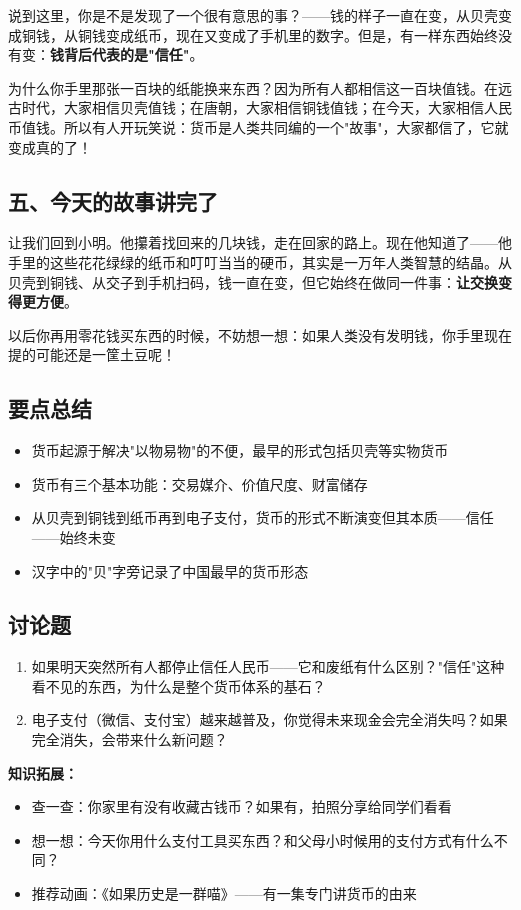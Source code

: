 \documentclass[a4paper,12pt]{ctexart}
\begin{document}
说到这里，你是不是发现了一个很有意思的事？——钱的样子一直在变，从贝壳变成铜钱，从铜钱变成纸币，现在又变成了手机里的数字。但是，有一样东西始终没有变：\textbf{钱背后代表的是"信任"}。

为什么你手里那张一百块的纸能换来东西？因为所有人都相信这一百块值钱。在远古时代，大家相信贝壳值钱；在唐朝，大家相信铜钱值钱；在今天，大家相信人民币值钱。所以有人开玩笑说：货币是人类共同编的一个"故事"，大家都信了，它就变成真的了！

\subsection*{五、今天的故事讲完了}

让我们回到小明。他攥着找回来的几块钱，走在回家的路上。现在他知道了——他手里的这些花花绿绿的纸币和叮叮当当的硬币，其实是一万年人类智慧的结晶。从贝壳到铜钱、从交子到手机扫码，钱一直在变，但它始终在做同一件事：\textbf{让交换变得更方便}。

以后你再用零花钱买东西的时候，不妨想一想：如果人类没有发明钱，你手里现在提的可能还是一筐土豆呢！

\subsection*{要点总结}
\begin{itemize}
  \item 货币起源于解决"以物易物"的不便，最早的形式包括贝壳等实物货币
  \item 货币有三个基本功能：交易媒介、价值尺度、财富储存
  \item 从贝壳到铜钱到纸币再到电子支付，货币的形式不断演变但其本质——信任——始终未变
  \item 汉字中的"贝"字旁记录了中国最早的货币形态
\end{itemize}

\subsection*{讨论题}
\begin{enumerate}
  \item 如果明天突然所有人都停止信任人民币——它和废纸有什么区别？"信任"这种看不见的东西，为什么是整个货币体系的基石？
  \item 电子支付（微信、支付宝）越来越普及，你觉得未来现金会完全消失吗？如果完全消失，会带来什么新问题？
\end{enumerate}

\vspace{0.3cm}
\textcolor{blue!70!black}{\textbf{知识拓展：}}
\begin{itemize}
  \item 查一查：你家里有没有收藏古钱币？如果有，拍照分享给同学们看看
  \item 想一想：今天你用什么支付工具买东西？和父母小时候用的支付方式有什么不同？
  \item 推荐动画：《如果历史是一群喵》——有一集专门讲货币的由来
\end{itemize}
\end{document}

